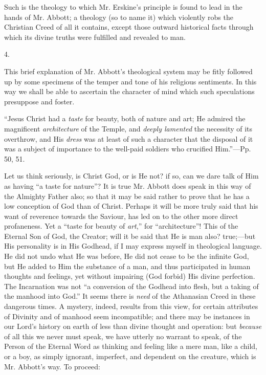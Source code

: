Such is the theology to which Mr. Erskine's
principle is found to lead in the hands of Mr. Abbott; a theology (so
to name it) which violently robs the Christian Creed of all it
contains, except those outward historical facts through which its
divine truths were fulfilled and revealed to man.

4.

This brief explanation of Mr. Abbott's
theological system may be fitly followed up by some specimens of the
temper and tone of his religious sentiments. In this way we shall be
able to ascertain the character of mind which such speculations
presuppose and foster.

``Jesus Christ
had a \emph{taste} for beauty, both of nature and art; He admired the
magnificent \emph{architecture} of the Temple, and \emph{deeply lamented}
the necessity of its overthrow, and His \emph{dress} was at least of
such a character that the disposal of it was a subject of importance
to the well-paid soldiers who crucified Him.''—Pp. 50, 51.

Let us think seriously, is Christ God, or is He
not? if so, can we dare talk of Him as having ``a taste for
nature''? It is true Mr. Abbott does speak in this way of the
Almighty Father also; so that it may be said rather to prove that he
has a low conception of God than of Christ. Perhaps it will be more
truly said that his want of reverence towards the Saviour, has led on
to the other more direct profaneness. Yet a ``taste for beauty of \emph{art},''
for ``architecture''! This of the Eternal Son of God, the Creator;
will it be said that He is man also? true;—but His personality is in
His Godhead, if I may express myself in theological language. He did
not undo what He was before, He did not cease to be the infinite God,
but He added to Him the substance of a man, and thus participated
in human thoughts and feelings, yet without impairing (God forbid) His
divine perfection. The Incarnation was not ``a conversion of the
Godhead into flesh, but a taking of the manhood into God.'' It seems
there is \emph{need} of the Athanasian Creed in these dangerous times.
A mystery, indeed, results from this view, for certain attributes of
Divinity and of manhood seem incompatible; and there may be instances
in our Lord's history on earth of less than divine thought and
operation: but \emph{because} of all this we never must speak, we have
utterly no warrant to speak, of the Person of the Eternal Word as
thinking and feeling like a mere man, like a child, or a boy, as
simply ignorant, imperfect, and dependent on the creature, which is
Mr. Abbott's way. To proceed:

